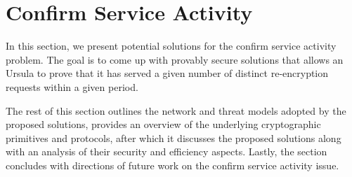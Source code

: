 \section{Confirm Service Activity}
In this section, we present potential solutions for the confirm service activity 
problem. The goal is to come up with provably secure solutions that allows an 
Ursula to prove that it has served a given number of distinct re-encryption 
requests within a given period. 


The rest of this section outlines the network and threat models adopted by 
the proposed solutions, provides an overview of the underlying cryptographic primitives and 
protocols, after which it discusses the proposed solutions along with an analysis of 
their security and efficiency aspects. Lastly, the section concludes with directions of 
future work on the confirm service activity issue.






